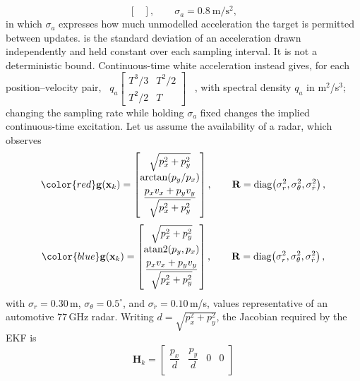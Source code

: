 \documentclass[graybox,envcountchap]{style/SNmono}
\providecommand{\DIFadd}[1]{{\protect\color{blue} #1}} %
\providecommand{\DIFdel}[1]{{\protect\color{red} #1}} %
\providecommand{\DIFaddbegin}{} %
\providecommand{\DIFaddend}{} %
\providecommand{\DIFdelbegin}{} %
\providecommand{\DIFdelend}{} %
\begin{document}
\begin{example}
\begin{equation}
\begin{bmatrix}
\end{bmatrix},
\qquad \sigma_a=0.8\ \mathrm{m/s^{2}},
\end{equation}
in which $\sigma_a$ \DIFdelbegin \DIFdel{expresses how much unmodelled acceleration the target is permitted between updates. }\DIFdelend \DIFaddbegin \DIFadd{is the standard deviation of an acceleration drawn independently and held constant over each sampling interval. It is not a deterministic bound. Continuous-time white acceleration instead gives, for each position--velocity pair, %
\mbox{%
$q_a\left[\begin{smallmatrix}T^3/3&T^2/2\\T^2/2&T\end{smallmatrix}\right]$
}%
, with spectral density $q_a$ in m$^2$/s$^3$; changing the sampling rate while holding $\sigma_a$ fixed changes the implied continuous-time excitation. 
}\DIFaddend Let us assume the availability of a radar, which observes
\DIFdelbegin \begin{displaymath}
\DIFdel{\mathbf{g}(\mathbf{x}_k)=
\begin{bmatrix}
\sqrt{p_x^{2}+p_y^{2}}\\[4pt]
\arctan\!\left(p_y/p_x\right)\\[4pt]
\dfrac{p_xv_x+p_yv_y}{\sqrt{p_x^{2}+p_y^{2}}}
\end{bmatrix},
\qquad
\mathbf{R}=\operatorname{diag}\!\left(\sigma_r^{2},\sigma_\theta^{2},\sigma_{\dot r}^{2}\right),
}\end{displaymath}%
\DIFdelend \DIFaddbegin \begin{equation}
\DIFadd{\mathbf{g}(\mathbf{x}_k)=
\begin{bmatrix}
\sqrt{p_x^{2}+p_y^{2}}\\[4pt]
\operatorname{atan2}(p_y,p_x)\\[4pt]
\dfrac{p_xv_x+p_yv_y}{\sqrt{p_x^{2}+p_y^{2}}}
\end{bmatrix},
\qquad
\mathbf{R}=\operatorname{diag}\!\left(\sigma_r^{2},\sigma_\theta^{2},\sigma_{\dot r}^{2}\right),
\label{eq:ekf-radar-meas}
}\end{equation}\DIFaddend 
with $\sigma_r=0.30$\,m, $\sigma_\theta=0.5^{\circ}$, and
$\sigma_{\dot r}=0.10$\,m/s, values representative of an automotive
$77$\,GHz radar. Writing $d=\sqrt{p_x^{2}+p_y^{2}}$, the Jacobian required by
the EKF is
\begin{equation}
\mathbf{H}_k=
\begin{bmatrix}
\dfrac{p_x}{d} & \dfrac{p_y}{d} & 0 & 0\\[8pt]

\end{bmatrix}
\end{equation}
\end{example}
\end{document}
